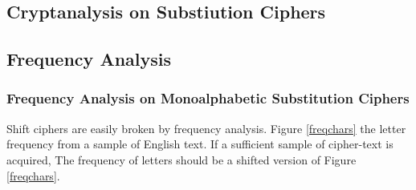 \documentclass[12pt]{article}
\begin{document}
\subsection{Cryptanalysis on Substiution Ciphers}

\subsection{Frequency Analysis}
\subsubsection{Frequency Analysis on Monoalphabetic Substitution Ciphers}
Shift ciphers are easily broken by frequency analysis. Figure \ref{freqchars} the letter frequency from a sample of English text. If a sufficient sample of cipher-text is acquired, The frequency of letters should be a shifted version of Figure \ref{freqchars}.
\end{document}
